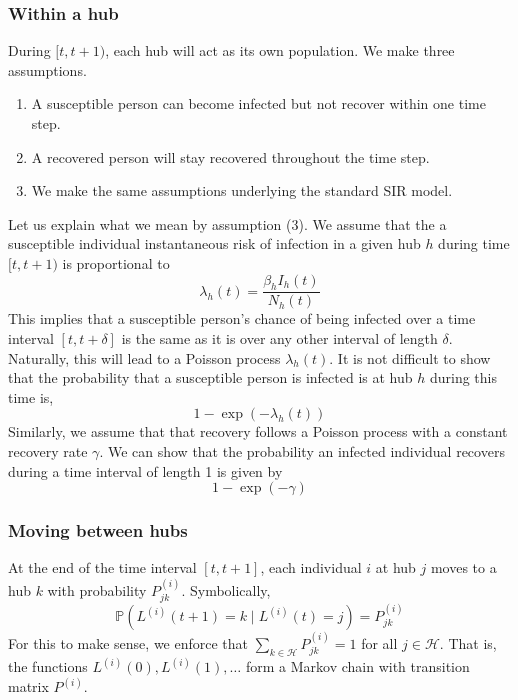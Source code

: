 \documentclass[a4paper]{article}
\begin{document}
	\subsubsection{Within a hub}
	During $[t, t + 1)$, each hub will act as its own population. We make three assumptions.
	\begin{enumerate}
		\item A susceptible person can become infected but not recover within one time step.
		\item A recovered person will stay recovered throughout the time step.
		\item We make the same assumptions underlying the standard SIR model.
	\end{enumerate}
	Let us explain what we mean by assumption (3). We assume that the a susceptible individual instantaneous risk of infection in a given hub $h$ during time $[t, t + 1)$ is proportional to
	$$\lambda_{h}(t) = \frac{\beta_{h}I_{h}(t)}{N_{h}(t)}$$
	This implies that a susceptible person's chance of being infected over a time interval $[t, t + \delta]$ is the same as it is over any other interval of length $\delta$. Naturally, this will lead to a Poisson process $\lambda_{h}(t)$. It is not difficult to show that the probability that a susceptible person is infected is at hub $h$ during this time is,
	$$1 - \exp(-\lambda_{h}(t))$$
	Similarly, we assume that that recovery follows a Poisson process with a constant recovery rate $\gamma$. We can show that the probability an infected individual recovers during a time interval of length 1  is given by
	$$1 - \exp(-\gamma)$$
	\subsubsection{Moving between hubs}
	At the end of the time interval $[t, t + 1]$, each individual $i$ at hub $j$ moves to a hub $k$ with probability $P_{jk}^{(i)}$. Symbolically,
	$$\mathbb{P}(L^{(i)}(t + 1) = k \mid L^{(i)}(t) = j) = P_{jk}^{(i)}$$
	For this to make sense, we enforce that $\sum_{k \in \mathcal{H}}P^{(i)}_{jk} = 1$ for all $j \in \mathcal{H}$. That is, the functions $L^{(i)}(0), L^{(i)}(1), \dots$ form a Markov chain with transition matrix $P^{(i)}$.
\end{document}
